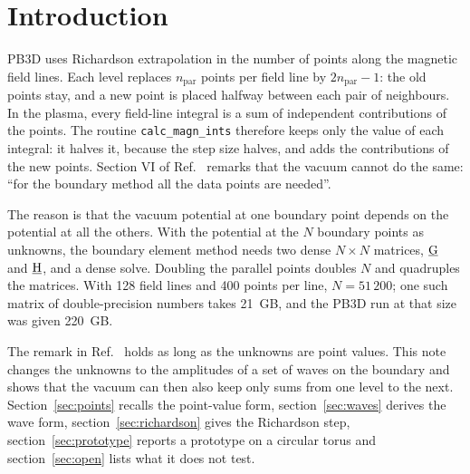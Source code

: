 \documentclass[%
 aip,
 rsi,%
 amsmath,amssymb,
 reprint,%
]{revtex4-1}
\begin{document}
\maketitle

\section{Introduction}
PB3D \cite{Weyens2017PB3D} uses Richardson extrapolation in the number of points along the magnetic field lines.
Each level replaces $n_\text{par}$ points per field line by $2n_\text{par}-1$: the old points stay, and a new point is placed halfway between each pair of neighbours.
In the plasma, every field-line integral is a sum of independent contributions of the points.
The routine \texttt{calc\_magn\_ints} therefore keeps only the value of each integral: it halves it, because the step size halves, and adds the contributions of the new points.
Section VI of Ref.~ remarks that the vacuum cannot do the same: ``for the boundary method all the data points are needed''.

The reason is that the vacuum potential at one boundary point depends on the potential at all the others.
With the potential at the $N$ boundary points as unknowns, the boundary element method needs two dense $N\times N$ matrices, $\underline{\mathrm{G}}$ and $\underline{\mathrm{H}}$, and a dense solve.
Doubling the parallel points doubles $N$ and quadruples the matrices.
With 128 field lines and 400 points per line, $N = 51\,200$; one such matrix of double-precision numbers takes 21~GB, and the PB3D run at that size was given 220~GB.

The remark in Ref.~ holds as long as the unknowns are point values.
This note changes the unknowns to the amplitudes of a set of waves on the boundary and shows that the vacuum can then also keep only sums from one level to the next.
Section~\ref{sec:points} recalls the point-value form, section~\ref{sec:waves} derives the wave form, section~\ref{sec:richardson} gives the Richardson step, section~\ref{sec:prototype} reports a prototype on a circular torus and section~\ref{sec:open} lists what it does not test.
\end{document}

